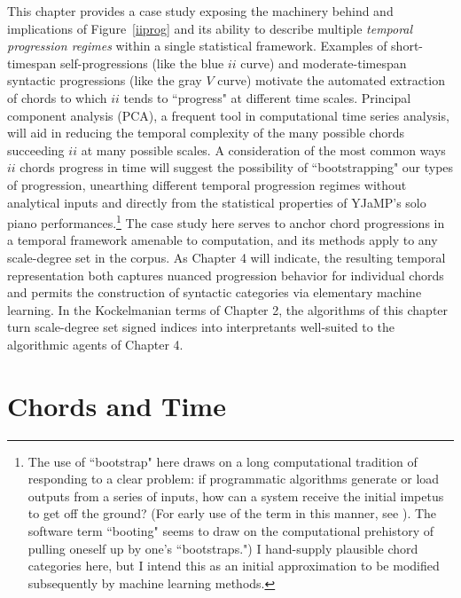 This chapter provides a case study exposing the machinery behind and implications of Figure~\ref{iiprog} and its ability to describe multiple \emph{temporal progression regimes} within a single statistical framework.  Examples of short-timespan self-progressions (like the blue $ii$ curve) and moderate-timespan syntactic progressions (like the gray $V$ curve) motivate the automated extraction of chords to which $ii$ tends to ``progress" at different time scales.  Principal component analysis (PCA), a frequent tool in computational time series analysis, will aid in reducing the temporal complexity of the many possible chords succeeding $ii$ at many possible scales.  A consideration of the most common ways $ii$ chords progress in time will suggest the possibility of ``bootstrapping" our types of progression, unearthing different temporal progression regimes without analytical inputs and directly from the statistical properties of YJaMP's solo piano performances.\footnote{The use of ``bootstrap" here draws on a long computational tradition of responding to a clear problem: if programmatic algorithms generate or load outputs from a series of inputs, how can a system receive the initial impetus to get off the ground?  (For early use of the term in this manner, see \cite{buchholz1953}).  The software term ``booting" seems to draw on the computational prehistory of pulling oneself up by one's ``bootstraps.")  I hand-supply plausible chord categories here, but I intend this as an initial approximation to be modified subsequently by machine learning methods.}  The case study here serves to anchor chord progressions in a temporal framework amenable to computation, and its methods apply to any scale-degree set in the corpus.  As Chapter 4 will indicate, the resulting temporal representation both captures nuanced progression behavior for individual chords and permits the construction of syntactic categories via elementary machine learning.  In the Kockelmanian terms of Chapter 2, the algorithms of this chapter turn scale-degree set signed indices into interpretants well-suited to the algorithmic agents of Chapter 4.

\section{Chords and Time}

